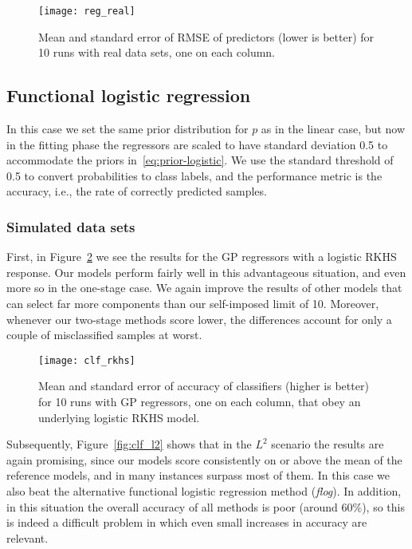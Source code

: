 \documentclass{article}
\numberwithin{equation}{section}
\theoremstyle{plain}
\theoremstyle{definition}
\begin{document}
\begin{figure}[ht!]
  \centering
  \texttt{[image: reg\_real]}
  \caption{Mean and standard error of RMSE of predictors (lower is better) for 10 runs with real data sets, one on each column.}\label{fig:reg_real}
\end{figure}

\subsection{Functional logistic regression}\label{sec:experiments-logistic}

In this case we set the same prior distribution for \(p\) as in the linear case, but now in the fitting phase the regressors are scaled to have standard deviation 0.5 to accommodate the priors in~\eqref{eq:prior-logistic}. We use the standard threshold of 0.5 to convert probabilities to class labels, and the performance metric is the accuracy, i.e., the rate of correctly predicted samples. 

\subsubsection*{Simulated data sets}

First, in Figure~\ref{fig:clf_rkhs} we see the results for the GP regressors with a logistic RKHS response. Our models perform fairly well in this advantageous situation, and even more so in the one-stage case. We again improve the results of other models that can select far more components than our self-imposed limit of 10. Moreover, whenever our two-stage methods score lower, the differences account for only a couple of misclassified samples at worst.

\begin{figure}[ht!]
  \centering
  \texttt{[image: clf\_rkhs]}
  \caption{Mean and standard error of accuracy of classifiers (higher is better) for 10 runs with GP regressors, one on each column, that obey an underlying logistic RKHS model.}\label{fig:clf_rkhs}
\end{figure}

Subsequently, Figure~\ref{fig:clf_l2} shows that in the \(L^2\) scenario the results are again promising, since our models score consistently on or above the mean of the reference models, and in many instances surpass most of them. In this case we also beat the alternative functional logistic regression method (\textit{flog}). In addition, in this situation the overall accuracy of all methods is poor (around 60\%), so this is indeed a difficult problem in which even small increases in accuracy are relevant.
\end{document}
